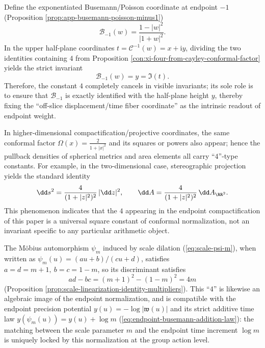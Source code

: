 \begin{proposition}\label{con:xi-busemann-ratio-cancels-four}
Define the exponentiated Busemann/Poisson coordinate at endpoint \(-1\) (Proposition \ref{prop:app-busemann-poisson-minus1})
\[
\mathcal{B}_{-1}(w)=\frac{1-|w|^{2}}{|1+w|^{2}}.
\]
In the upper half-plane coordinates \(t=\mathcal{C}^{-1}(w)=x+\mathrm{i}y\), dividing the two identities containing \(4\) from Proposition \ref{con:xi-four-from-cayley-conformal-factor} yields the strict invariant
\[
\boxed{\;\mathcal{B}_{-1}(w)=y=\Im(t).\;}
\]
Therefore, the constant \(4\) completely cancels in visible invariants; its sole role is to ensure that \(\mathcal{B}_{-1}\) is exactly identified with the half-plane height \(y\), thereby fixing the ``off-slice displacement/time fiber coordinate'' as the intrinsic readout of endpoint weight.
\end{proposition}

\begin{proposition}\label{con:xi-four-as-universal_conformal_square}
In higher-dimensional compactification/projective coordinates, the same conformal factor \(\Omega(x)=\frac{2}{1+|x|^{2}}\) and its squares or powers also appear; hence the pullback densities of spherical metrics and area elements all carry ``\(4\)''-type constants.
For example, in the two-dimensional case, stereographic projection yields the standard identity
\[
\dd s^{2}=\frac{4}{(1+|z|^{2})^{2}}\,|\dd z|^{2},
\qquad
\dd A=\frac{4}{(1+|z|^{2})^{2}}\,\dd A_{\RR^{2}}.
\]
This phenomenon indicates that the \(4\) appearing in the endpoint compactification of this paper is a universal square constant of conformal normalization, not an invariant specific to any particular arithmetic object.
\end{proposition}

\begin{proposition}\label{con:xi-four_in_mobius_discriminant}
The M\"obius automorphism \(\psi_m\) induced by scale dilation (\eqref{eq:scale-psi-m}), when written as \(\psi_m(u)=(au+b)/(cu+d)\), satisfies
\(
a=d=m+1,\ b=c=1-m
\), so its discriminant satisfies
\[
ad-bc=(m+1)^{2}-(1-m)^{2}=4m
\]
(Proposition \ref{prop:scale-linearization-identity-multipliers}).
This ``\(4\)'' is likewise an algebraic image of the endpoint normalization, and is compatible with the endpoint precision potential
\(
y(u)=-\log|\mathfrak{w}(u)|
\)
and its strict additive time law
\(
y(\psi_m(u))=y(u)+\log m
\)
(\eqref{eq:endpoint-busemann-addition-law}): the matching between the scale parameter \(m\) and the endpoint time increment \(\log m\) is uniquely locked by this normalization at the group action level.
\end{proposition}


